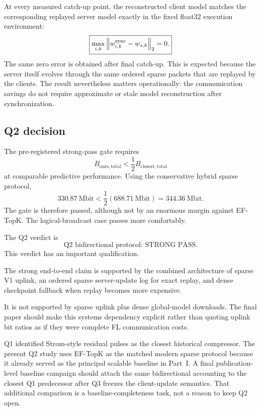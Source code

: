 At every measured catch-up point, the reconstructed client model matches the corresponding replayed server model exactly in the fixed float32 execution environment:
\begin{equation}
\boxed{
\max_{i,k}\left\lVert w_{i,k}^{\mathrm{sync}}-w_{s,k}\right\rVert_2=0.
}
\end{equation}
The same zero error is obtained after final catch-up. This is expected because the server itself evolves through the same ordered sparse packets that are replayed by the clients. The result nevertheless matters operationally: the communication savings do not require approximate or stale model reconstruction after synchronization.

\subsection{Q2 decision}

The pre-registered strong-pass gate requires
\begin{equation}
B_{\mathrm{ours,total}}
<\frac12B_{\mathrm{closest,total}}
\end{equation}
at comparable predictive performance. Using the conservative hybrid sparse protocol,
\begin{equation}
330.87\ \text{Mbit}
<
\frac12(688.71\ \text{Mbit})
=344.36\ \text{Mbit}.
\end{equation}
The gate is therefore passed, although not by an enormous margin against EF-TopK. The logical-broadcast case passes more comfortably.

The Q2 verdict is
\begin{equation}
\boxed{\text{Q2 bidirectional protocol: STRONG PASS}.}
\end{equation}
This verdict has an important qualification.
\begin{takeawaybox}[title={Q2 final protocol architecture}]
The strong end-to-end claim is supported by the combined architecture of sparse V1 uplink, an ordered sparse server-update log for exact replay, and dense checkpoint fallback when replay becomes more expensive.
\end{takeawaybox}
It is not supported by sparse uplink plus dense global-model downloads. The final paper should make this systems dependency explicit rather than quoting uplink bit ratios as if they were complete FL communication costs.

Q1 identified Strom-style residual pulses as the closest historical compressor. The present Q2 study uses EF-TopK as the matched modern sparse protocol because it already served as the principal scalable baseline in Part~I. A final publication-level baseline campaign should attach the same bidirectional accounting to the closest Q1 predecessor after Q3 freezes the client-update semantics. That additional comparison is a baseline-completeness task, not a reason to keep Q2 open.
